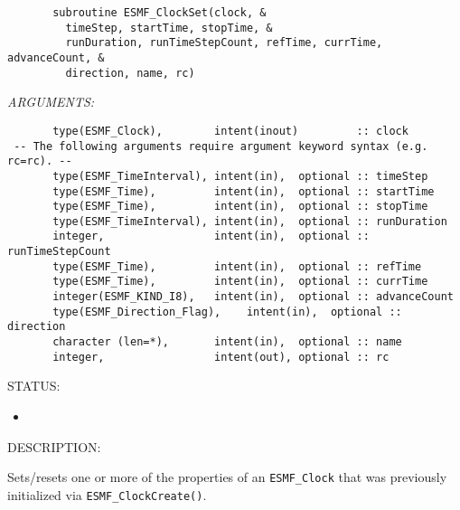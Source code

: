  
\begin{verbatim}       subroutine ESMF_ClockSet(clock, &
         timeStep, startTime, stopTime, &
         runDuration, runTimeStepCount, refTime, currTime, advanceCount, &
         direction, name, rc)
 \end{verbatim}{\em ARGUMENTS:}
\begin{verbatim}       type(ESMF_Clock),        intent(inout)         :: clock
 -- The following arguments require argument keyword syntax (e.g. rc=rc). --
       type(ESMF_TimeInterval), intent(in),  optional :: timeStep
       type(ESMF_Time),         intent(in),  optional :: startTime
       type(ESMF_Time),         intent(in),  optional :: stopTime
       type(ESMF_TimeInterval), intent(in),  optional :: runDuration
       integer,                 intent(in),  optional :: runTimeStepCount
       type(ESMF_Time),         intent(in),  optional :: refTime
       type(ESMF_Time),         intent(in),  optional :: currTime
       integer(ESMF_KIND_I8),   intent(in),  optional :: advanceCount
       type(ESMF_Direction_Flag),    intent(in),  optional :: direction
       character (len=*),       intent(in),  optional :: name
       integer,                 intent(out), optional :: rc
 \end{verbatim}
{\sf STATUS:}
   \begin{itemize}
   \item{}
   \end{itemize}
  
{\sf DESCRIPTION:\\ }


       \begin{sloppypar}
       Sets/resets one or more of the properties of an {\tt ESMF\_Clock} that
       was previously initialized via {\tt ESMF\_ClockCreate()}.
       \end{sloppypar}
  

